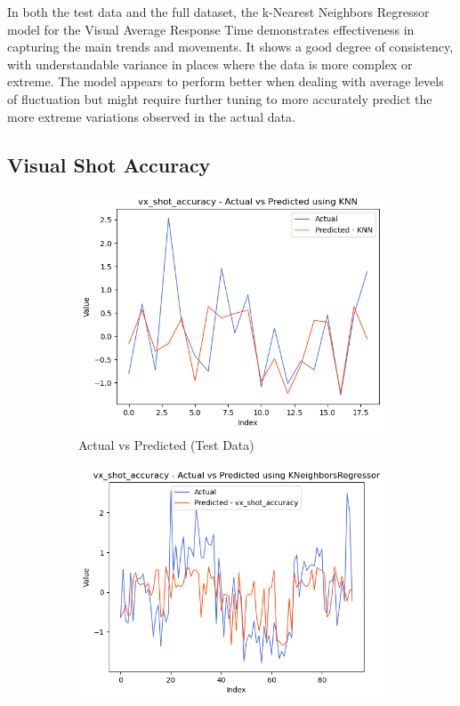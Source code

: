 In both the test data and the full dataset, the k-Nearest Neighbors Regressor model for the Visual Average Response Time demonstrates effectiveness in capturing the main trends and movements.
It shows a good degree of consistency, with understandable variance in places where the data is more complex or extreme. The model appears to perform better when dealing with average levels of 
fluctuation but might require further tuning to more accurately predict the more extreme variations observed in the actual data.


\subsection*{Visual Shot Accuracy}

\begin{figure}[htbp]
    \centering
    \begin{subfigure}[b]{0.49\textwidth}
        \centering
        \includegraphics[width=\textwidth]{images/regressionCharts/test_data_visual_shot_accuracy.png}
        \caption{Actual vs Predicted (Test Data)}
        \label{fig:actual_vs_predicted_vx_shot_accuracy_test}
    \end{subfigure}\hfill
    \begin{subfigure}[b]{0.49\textwidth}
        \centering
        \includegraphics[width=\textwidth]{images/regressionCharts/all_data_visual_shot_accuracy.png}

\end{subfigure}
\end{figure}
